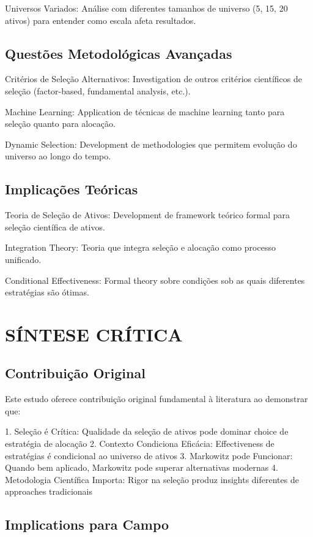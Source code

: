 Universos Variados: Análise com diferentes tamanhos de universo (5, 15, 20 ativos) para entender como escala afeta resultados.

\subsection{Questões Metodológicas Avançadas}

Critérios de Seleção Alternativos: Investigation de outros critérios científicos de seleção (factor-based, fundamental analysis, etc.).

Machine Learning: Application de técnicas de machine learning tanto para seleção quanto para alocação.

Dynamic Selection: Development de methodologies que permitem evolução do universo ao longo do tempo.

\subsection{Implicações Teóricas}

Teoria de Seleção de Ativos: Development de framework teórico formal para seleção científica de ativos.

Integration Theory: Teoria que integra seleção e alocação como processo unificado.

Conditional Effectiveness: Formal theory sobre condições sob as quais diferentes estratégias são ótimas.

\section{SÍNTESE CRÍTICA}

\subsection{Contribuição Original}

Este estudo oferece contribuição original fundamental à literatura ao demonstrar que:

1. Seleção é Crítica: Qualidade da seleção de ativos pode dominar choice de estratégia de alocação
2. Contexto Condiciona Eficácia: Effectiveness de estratégias é condicional ao universo de ativos
3. Markowitz pode Funcionar: Quando bem aplicado, Markowitz pode superar alternativas modernas
4. Metodologia Científica Importa: Rigor na seleção produz insights diferentes de approaches tradicionais

\subsection{Implications para Campo}

